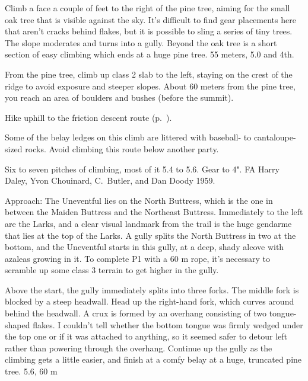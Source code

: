 \documentclass{tahquitz}
\begin{document}
 Climb a face a couple of feet to the right of the pine tree,
aiming for the small oak tree that is visible against the sky. It's
difficult to find gear placements here that aren't cracks behind
flakes, but it is possible to sling a series of tiny trees. The slope
moderates and turns into a gully. Beyond the oak tree is a short
section of easy climbing which ends at a huge pine tree. 55 meters,
5.0 and 4th.

From the pine tree, climb up class 2 slab to the left, staying on
the crest of the ridge to avoid exposure and steeper slopes. About 60
meters from the pine tree, you reach an area of boulders and bushes
(before the summit).

Hike uphill to the friction descent route (p.~\pageref{subsec:friction-descent}).





Some of the belay ledges on this climb
are littered with baseball- to cantaloupe-sized rocks.
Avoid climbing this route below
another party.

Six to seven pitches of climbing, most of it 5.4 to 5.6. Gear to 4".
FA Harry Daley, Yvon Chouinard, C.~Butler, and Dan Doody 1959.

Approach: The Uneventful lies on the North Buttress, which is the one
in between the Maiden Buttress and the Northeast Buttress. Immediately
to the left are the Larks, and a clear visual landmark from the trail
is the huge gendarme that lies at the top of the Larks. A gully
splits the North Buttress in two at the bottom, and the Uneventful starts in this gully,
at a deep, shady alcove with azaleas
growing in it.
To complete P1 with a 60 m rope, it's necessary to scramble up some
class 3 terrain to get higher in the gully.

 Above the start, the gully immediately splits into three
forks. The middle fork is blocked by a steep headwall.
Head up the right-hand fork, which curves around behind
the headwall. A crux is formed by an overhang consisting 
of two tongue-shaped flakes.
I couldn't tell whether the bottom tongue was firmly wedged under the top
one or if it was attached to anything, so it seemed safer to detour left
rather than powering through the overhang. Continue up the gully as the
climbing gets a little easier, and finish at a comfy belay at a huge,
truncated pine tree. 5.6, 60 m
\end{document}

